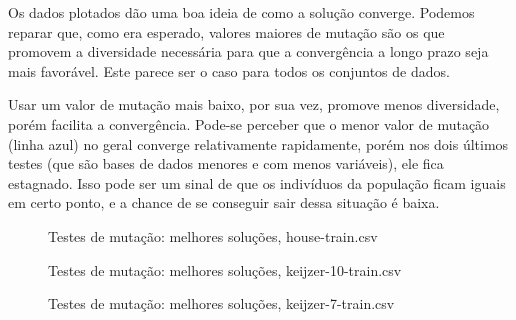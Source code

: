 \documentclass[11pt]{article}
\begin{document}
Os dados plotados dão uma boa ideia de como a solução converge. Podemos reparar que, como era esperado, valores maiores de mutação são os que promovem a diversidade necessária para que a convergência a longo prazo seja mais favorável. Este parece ser o caso para todos os conjuntos de dados.

Usar um valor de mutação mais baixo, por sua vez, promove menos diversidade, porém facilita a convergência. Pode-se perceber que o menor valor de mutação (linha azul) no geral converge relativamente rapidamente, porém nos dois últimos testes (que são bases de dados menores e com menos variáveis), ele fica estagnado. Isso pode ser um sinal de que os indivíduos da população ficam iguais em certo ponto, e a chance de se conseguir sair dessa situação é baixa.

\begin{figure}[!ht]
	\centering
    \caption{Testes de mutação: melhores soluções, house-train.csv}
    \label{fig:data}
\end{figure}

\begin{figure}[!ht]
	\centering
    \caption{Testes de mutação: melhores soluções, keijzer-10-train.csv}
    \label{fig:data}
\end{figure}

\begin{figure}[!ht]
	\centering
    \caption{Testes de mutação: melhores soluções, keijzer-7-train.csv}
    \label{fig:data}
\end{figure}
\end{document}
